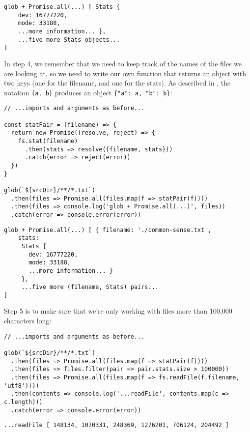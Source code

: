 \begin{verbatim}
glob + Promise.all(...) [ Stats {
    dev: 16777220,
    mode: 33188,
    ...more information... },
    ...five more Stats objects...
]
\end{verbatim}

In step 4,
we remember that we need to keep track of the names of the files we are looking at,
so we need to write our own function that returns an object with two keys
(one for the filename, and one for the stats).
As described in ,
the notation \texttt{\{a,\ b\}} produces an object \texttt{\{"a":\ a,\ "b":\ b\}}:

\begin{verbatim}
// ...imports and arguments as before...

const statPair = (filename) => {
  return new Promise((resolve, reject) => {
    fs.stat(filename)
      .then(stats => resolve({filename, stats}))
      .catch(error => reject(error))
  })
}

glob(`${srcDir}/**/*.txt`)
  .then(files => Promise.all(files.map(f => statPair(f))))
  .then(files => console.log('glob + Promise.all(...)', files))
  .catch(error => console.error(error))
\end{verbatim}

\begin{verbatim}
glob + Promise.all(...) [ { filename: './common-sense.txt',
    stats:
     Stats {
       dev: 16777220,
       mode: 33188,
       ...more information... }
     },
     ...five more (filename, Stats) pairs...
]
\end{verbatim}

Step 5 is to make sure that
we're only working with files more than 100,000 characters long:

\begin{verbatim}
// ...imports and arguments as before...

glob(`${srcDir}/**/*.txt`)
  .then(files => Promise.all(files.map(f => statPair(f))))
  .then(files => files.filter(pair => pair.stats.size > 100000))
  .then(files => Promise.all(files.map(f => fs.readFile(f.filename, 'utf8'))))
  .then(contents => console.log('...readFile', contents.map(c => c.length)))
  .catch(error => console.error(error))
\end{verbatim}

\begin{verbatim}
...readFile [ 148134, 1070331, 248369, 1276201, 706124, 204492 ]
\end{verbatim}

